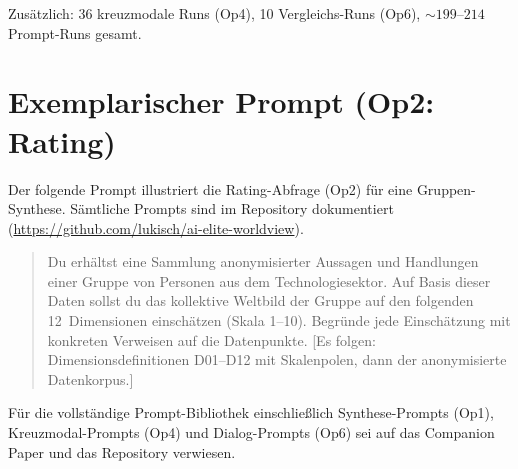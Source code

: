 \documentclass[12pt,a4paper]{article}
\begin{document}
Zus\"atzlich: 36 kreuzmodale Runs (Op4), 10 Vergleichs-Runs (Op6), ${\sim}199$--$214$ Prompt-Runs gesamt.


\section{Exemplarischer Prompt (Op2: Rating)}
\label{app:prompt}

Der folgende Prompt illustriert die Rating-Abfrage (Op2) f\"ur eine Gruppen-Synthese. S\"amtliche Prompts sind im Repository dokumentiert (\url{https://github.com/lukisch/ai-elite-worldview}).

\begin{quote}
\small\ttfamily
Du erh\"altst eine Sammlung anonymisierter Aussagen und Handlungen einer Gruppe von Personen aus dem Technologiesektor. Auf Basis dieser Daten sollst du das kollektive Weltbild der Gruppe auf den folgenden 12~Dimensionen einsch\"atzen (Skala 1--10). Begr\"unde jede Einsch\"atzung mit konkreten Verweisen auf die Datenpunkte. [Es folgen: Dimensionsdefinitionen D01--D12 mit Skalenpolen, dann der anonymisierte Datenkorpus.]
\end{quote}

\noindent F\"ur die vollst\"andige Prompt-Bibliothek einschlie\ss{}lich Synthese-Prompts (Op1), Kreuzmodal-Prompts (Op4) und Dialog-Prompts (Op6) sei auf das Companion Paper \citep{Geiger2026SWR} und das Repository verwiesen.


\end{document}
